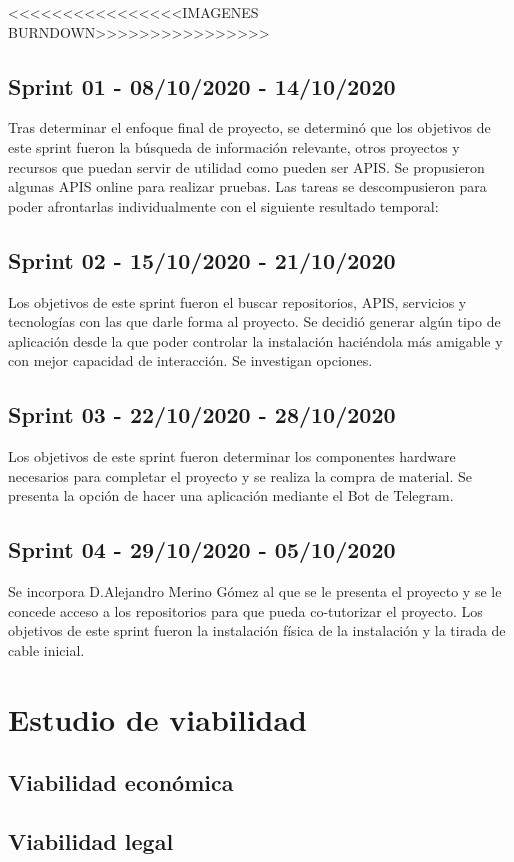 <<<<<<<<<<<<<<<<IMAGENES BURNDOWN>>>>>>>>>>>>>>>>

\subsection{Sprint 01 - 08/10/2020 - 14/10/2020}
Tras determinar el enfoque final de proyecto, se determinó que los objetivos de este sprint fueron la búsqueda de información relevante, otros proyectos y recursos que puedan servir de utilidad como pueden ser APIS. Se propusieron algunas APIS online para realizar pruebas.
Las tareas se descompusieron para poder afrontarlas individualmente con el siguiente resultado temporal:

\subsection{Sprint 02 - 15/10/2020 - 21/10/2020}
Los objetivos de este sprint fueron el buscar repositorios, APIS, servicios y tecnologías con las que darle forma al proyecto. Se decidió generar algún tipo de aplicación desde la que poder controlar la instalación haciéndola más amigable y con mejor capacidad de interacción. Se investigan opciones.

\subsection{Sprint 03 - 22/10/2020 - 28/10/2020}
Los objetivos de este sprint fueron determinar los componentes hardware necesarios para completar el proyecto y se realiza la compra de material.
Se presenta la opción de hacer una aplicación mediante el Bot de Telegram.

\subsection{Sprint 04 - 29/10/2020 - 05/10/2020}
Se incorpora D.Alejandro Merino Gómez al que se le presenta el proyecto y se le concede acceso a los repositorios para que pueda co-tutorizar el proyecto.
Los objetivos de este sprint fueron la instalación física de la instalación y la tirada de cable inicial.







\section{Estudio de viabilidad}

\subsection{Viabilidad económica}

\subsection{Viabilidad legal}


